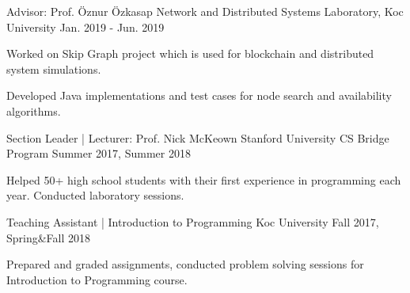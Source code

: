 
\begin{cventries}
  \cvopenentry
    {Advisor: Prof. Öznur Özkasap} %
    {Network and Distributed Systems Laboratory, Koc University} %
    {}
    {Jan. 2019 - Jun. 2019} %
    {
      \begin{cvitems} %
        \item {Worked on Skip Graph project which is used for blockchain and distributed system simulations.}
        \item {Developed Java implementations and test cases for node search and availability algorithms.}
      \end{cvitems}
    }

  \cvopenentry
    {Section Leader | Lecturer: Prof. Nick McKeown } %
    {Stanford University CS Bridge Program} %
    {}
    {Summer 2017, Summer 2018} %
    {
      \begin{cvitems} %
        \item {Helped 50+ high school students with their first experience in programming each year. Conducted laboratory sessions.}
      \end{cvitems}
    }

  \cvopenentry
    {Teaching Assistant | Introduction to Programming } %
    {Koc University} %
    {}
    {Fall 2017, Spring\&Fall 2018} %
    {
      \begin{cvitems} %
        \item {Prepared and graded assignments, conducted problem solving sessions for Introduction to Programming course.}
      \end{cvitems}
    }


\end{cventries}
